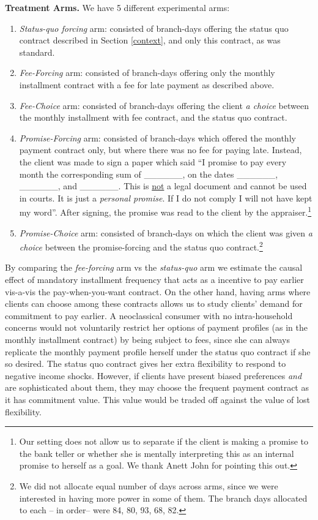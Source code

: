 \documentclass[oneside,11pt]{article}
\begin{document}
\vspace{.2in}
\noindent \textbf{Treatment Arms.} We have 5 different experimental arms: 

\begin{enumerate}
    \item \textit{Status-quo forcing} arm: consisted of branch-days offering the status quo contract described in Section \ref{context}, and only this contract, as was standard. 
    \item \textit{Fee-Forcing} arm: consisted of branch-days offering only the monthly installment contract with a fee for late payment as described above. 
    \item \textit{Fee-Choice} arm: consisted of branch-days offering the client \textit{a choice} between the monthly installment with fee contract, and the status quo contract.
    \item \textit{Promise-Forcing} arm: consisted of branch-days which offered the monthly payment contract only, but where there was no fee for paying late. Instead, the client was made to sign a paper which said ``I promise to pay every month the corresponding sum of \_\_\_\_\_\_, on the dates \_\_\_\_\_\_, \_\_\_\_\_\_, and \_\_\_\_\_\_. This is \underline{not} a legal document and cannot be used in courts. It is just a \textit{personal promise}. If I do not comply I will not have kept my word''. After signing, the promise was read to the client by the appraiser.\footnote{Our setting does not allow us to separate if the client is making a promise to the bank teller or whether she is mentally interpreting this as an internal promise to herself as a goal. We thank Anett John for pointing this out.}
    
    \item \textit{Promise-Choice} arm: consisted of branch-days on which the client was given \textit{a choice} between the promise-forcing and the status quo contract.\footnote{We did not allocate equal number of days across arms, since we were interested in having more power in some of them. The branch days allocated to each -- in order-- were 84, 80, 93, 68, 82.}
\end{enumerate}

By comparing the \textit{fee-forcing} arm vs the \textit{status-quo} arm we estimate the causal effect of mandatory installment frequency that acts as a incentive to pay earlier vis-a-vis the pay-when-you-want contract. On the other hand, having arms where clients can choose among these contracts allows us to study clients' demand for commitment to pay earlier. A neoclassical consumer with no intra-household concerns would not voluntarily restrict her options of payment profiles (as in the monthly installment contract) by being subject to fees, since she can always replicate the monthly payment profile herself under the status quo contract if she so desired. The status quo contract gives her extra flexibility to respond to negative income shocks. However, if clients have present biased preferences \textit{and} are sophisticated about them, they may choose the frequent payment contract as it has commitment value. This value would be traded off against the value of lost flexibility. 
\end{document}
